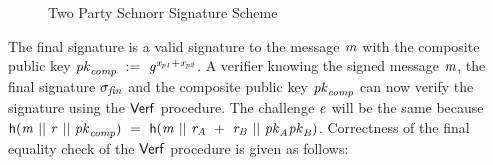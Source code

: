 \begin{figure}
    \label{fig:twoparty-schnorr}
    \parbox{\textwidth}{
        \fbox{
            \procedure[linenumbering, syntaxhighlight=auto]{$\procSetupPartSig{\varSecParam}$}{
                \varNonce \sample \cnstIntegersPrimeWithoutZero{\varPrime} \\
                \varRand \opAssign \funGen{\varRand} \\
                \pcreturn (\varNonce, \varRand)
            }
            \procedure[linenumbering, syntaxhighlight=auto]{$\procGenPartSig{\varMsg}{\varSecKeyAlice}{\varNonceAlice}{\varPubKeyBob}{\varRandBob}$} {
                \varSchnorrChallenge \opAssign \funHash{\varMsg \opConc \varRandAlice \opAdd \varRandBob \opConc \varPubKeyAlice \opAdd \varPubKeyBob} \\
                \varS \opAssign \varNonceAlice \opAdd \varSchnorrChallenge \opMult \varSecKeyAlice \\
                \pcreturn \varSigAlice \opAssign \varS
            } \\[2\baselineskip]
            \procedure[linenumbering, syntaxhighlight=auto]{$\procVerfPartSig{\varMsg}{\varSecKeyAlice}{\varNonceAlice}{\varPubKeyBob}{\varRandBob}{\varSigBob}$} {
                \varSchnorrChallenge \opAssign \funHash{\varMsg \opConc \varRandAlice \opAdd \varRandBob \opConc \varPubKeyAlice \opAdd \varPubKeyBob} \\
                \varS \opAssign \opAccess{\varSigBob}{\varS} \\
                \pcreturn \funGen{\varS} \opEq \varRandBob \opAdd \varSchnorrChallenge \opMult \varPubKeyBob
            } \\[2\baselineskip]
            \procedure[linenumbering, syntaxhighlight=auto]{$\procFinSig{\varSigAlice}{\varSigBob}{\varRandAlice}{\varRandBob}$} {
                \varS_\varAlice \opAssign \opAccess{\varSigAlice}{\varS} \\
                \varS_\varBob \opAssign \opAccess{\varSigBob}{\varS} \\
                \pcreturn \varSigFin \opAssign (\varS \opAssign \varS_\varAlice \opAdd \varS_\varBob \opSeperate \varRand \opAssign \varRandAlice \opAdd \varRandBob)
            }
        }
    }
    \caption{Two Party Schnorr Signature Scheme}
\end{figure}

The final signature is a valid signature to the message $\mathit{m}$ with the composite public key $\mathit{pk}_{\mathit{comp}} ~:=~ \mathit{g}^{\mathit{x}_{\mathit{p1}} + \mathit{x}_{\mathit{p2}}}$.
A verifier knowing the signed message $\mathit{m}$, the final signature $\sigma_{\mathit{fin}}$ and the composite public key $\mathit{pk}_{\mathit{comp}}$ can now verify the signature using the $\mathsf{Verf}$ procedure.
The challenge $\mathit{e}$ will be the same because
$\mathsf{h} (\mathit{m} ~||~ \mathit{r} ~||~ \mathit{pk}_{\mathit{comp}}) ~=~ \mathsf{h} (\mathit{m} ~||~ \mathit{r}_{\mathit{A}} ~+~ \mathit{r}_{\mathit{B}} ~||~ \mathit{pk}_{\mathit{A}} \mathit{pk}_{\mathit{B}})$.
Correctness of the final equality check of the $\mathsf{Verf}$ procedure is given as follows:

